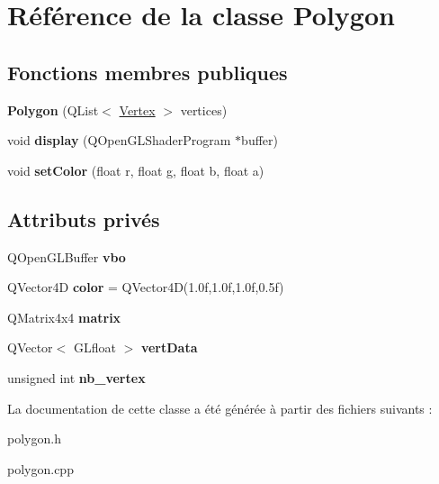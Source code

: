 \hypertarget{classPolygon}{}\section{Référence de la classe Polygon}
\label{classPolygon}
\subsection*{Fonctions membres publiques}
\begin{DoxyCompactItemize}
\item 
\mbox{\label{classPolygon_aaaff7e587ca71e9b9c7d32e8a199bdce}} 
{\bfseries Polygon} (Q\+List$<$ \hyperlink{classVertex}{Vertex} $>$ vertices)
\item 
\mbox{\label{classPolygon_a3cbc92aba708e0fbf1a48101fa084249}} 
void {\bfseries display} (Q\+Open\+G\+L\+Shader\+Program $\ast$buffer)
\item 
\mbox{\label{classPolygon_ad3a91214971b15422c4d81bda8464172}} 
void {\bfseries set\+Color} (float r, float g, float b, float a)
\end{DoxyCompactItemize}
\subsection*{Attributs privés}
\begin{DoxyCompactItemize}
\item 
\mbox{\label{classPolygon_a2576f9336fa5379a2b1bca42100515d3}} 
Q\+Open\+G\+L\+Buffer {\bfseries vbo}
\item 
\mbox{\label{classPolygon_ab450666c91e1a2e97d6cd82987504776}} 
Q\+Vector4D {\bfseries color} = Q\+Vector4D(1.\+0f,1.\+0f,1.\+0f,0.\+5f)
\item 
\mbox{\label{classPolygon_adeb6935d2e4397813be6844d2e71f405}} 
Q\+Matrix4x4 {\bfseries matrix}
\item 
\mbox{\label{classPolygon_a9041e6bbc60be2adca1144531e29f286}} 
Q\+Vector$<$ G\+Lfloat $>$ {\bfseries vert\+Data}
\item 
\mbox{\label{classPolygon_a34c994b2382f7a2a99d2302054a85bf5}} 
unsigned int {\bfseries nb\+\_\+vertex}
\end{DoxyCompactItemize}


La documentation de cette classe a été générée à partir des fichiers suivants \+:\begin{DoxyCompactItemize}
\item 
polygon.\+h\item 
polygon.\+cpp\end{DoxyCompactItemize}
